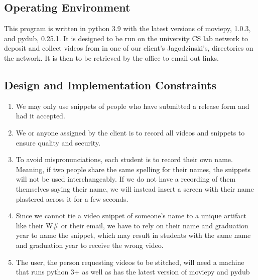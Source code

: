 \subsection{Operating Environment}
This program is written in python 3.9 with the latest versions of moviepy, 1.0.3, 
and pydub, 0.25.1. It is designed to be run on the university CS lab network to 
deposit and collect videos from in one of our client's Jagodzinski's, directories 
on the network. It is then to be retrieved by the office to email out links.

\subsection{Design and Implementation Constraints}
\begin{enumerate}
    \item We may only use snippets of people who have submitted a release 
    form and had it accepted.
    \item We or anyone assigned by the client is to record all videos and 
    snippets to ensure quality and security.
    \item To avoid mispronunciations, each student is to record their 
    own name. Meaning, if two people share the same spelling for their 
    names, the snippets will not be used interchangeably. If we do not have 
    a recording of them themselves saying their name, we will instead 
    insert a screen with their name plastered across it for a few seconds.
    \item Since we cannot tie a video snippet of someone's name to a unique 
    artifact like their W\# or their email, we have to rely on their name 
    and graduation year to name the snippet, which may result in students 
    with the same name and graduation year to receive the wrong video.
    \item The user, the person requesting videos to be stitched, will 
    need a machine that runs python 3+ as well as has the latest version 
    of moviepy and pydub
\end{enumerate}

